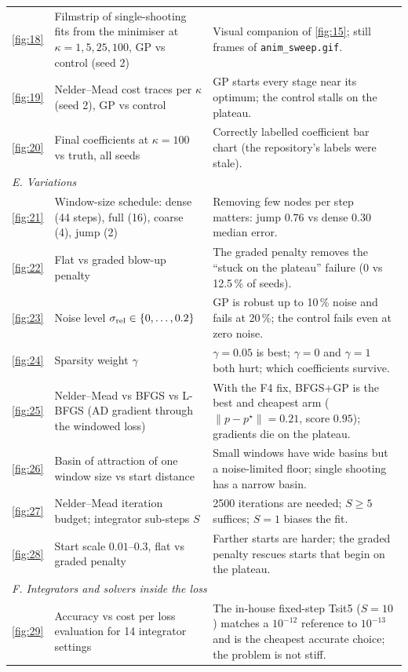 \documentclass[10pt]{article}
\newcommand{\pstar}{p^\star}
\newcommand{\perr}{\lVert p - \pstar\rVert}
\begin{document}
\begin{longtable}{p{} p{} p{}}
\ref{fig:18} & Filmstrip of single-shooting fits from the minimiser at $\kappa=1,5,25,100$, GP vs control (seed 2) & Visual companion of \ref{fig:15}; still frames of \texttt{anim\_sweep.gif}.\\
\ref{fig:19} & Nelder--Mead cost traces per $\kappa$ (seed 2), GP vs control & GP starts every stage near its optimum; the control stalls on the plateau.\\
\ref{fig:20} & Final coefficients at $\kappa=100$ vs truth, all seeds & Correctly labelled coefficient bar chart (the repository's labels were stale).\\
\midrule
\multicolumn{3}{l}{\emph{E. Variations}}\\
\ref{fig:21} & Window-size schedule: dense (44 steps), full (16), coarse (4), jump (2) & Removing few nodes per step matters: jump $0.76$ vs dense $0.30$ median error.\\
\ref{fig:22} & Flat vs graded blow-up penalty & The graded penalty removes the ``stuck on the plateau'' failure (0 vs 12.5\,\% of seeds).\\
\ref{fig:23} & Noise level $\sigma_{\rm rel}\in\{0,\dots,0.2\}$ & GP is robust up to 10\,\% noise and fails at 20\,\%; the control fails even at zero noise.\\
\ref{fig:24} & Sparsity weight $\gamma$ & $\gamma=0.05$ is best; $\gamma=0$ and $\gamma=1$ both hurt; which coefficients survive.\\
\ref{fig:25} & Nelder--Mead vs BFGS vs L-BFGS (AD gradient through the windowed loss) & With the F4 fix, BFGS+GP is the best and cheapest arm ($\perr=0.21$, score $0.95$); gradients die on the plateau.\\
\ref{fig:26} & Basin of attraction of one window size vs start distance & Small windows have wide basins but a noise-limited floor; single shooting has a narrow basin.\\
\ref{fig:27} & Nelder--Mead iteration budget; integrator sub-steps $S$ & 2500 iterations are needed; $S\ge5$ suffices; $S=1$ biases the fit.\\
\ref{fig:28} & Start scale $0.01$--$0.3$, flat vs graded penalty & Farther starts are harder; the graded penalty rescues starts that begin on the plateau.\\
\midrule
\multicolumn{3}{l}{\emph{F. Integrators and solvers inside the loss}}\\
\ref{fig:29} & Accuracy vs cost per loss evaluation for 14 integrator settings & The in-house fixed-step Tsit5 ($S=10$) matches a $10^{-12}$ reference to $10^{-13}$ and is the cheapest accurate choice; the problem is not stiff.\\

\end{longtable}
\end{document}
